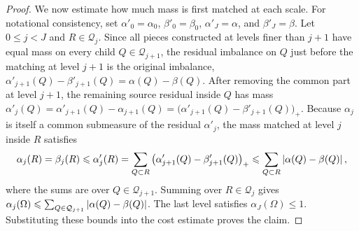 \begin{proof}
	We now estimate how much mass is first matched at each scale. For notational consistency, set \(\alpha'_0=\alpha_0\), \(\beta'_0=\beta_0\), \(\alpha'_J=\alpha\), and \(\beta'_J=\beta\). Let \(0\leq j<J\) and \(R\in\mathcal Q_j\). Since all pieces constructed at levels finer than \(j+1\) have equal mass on every child \(Q\in\mathcal Q_{j+1}\), the residual imbalance on \(Q\) just before the matching at level \(j+1\) is the original imbalance, \(\alpha'_{j+1}(Q)-\beta'_{j+1}(Q)=\alpha(Q)-\beta(Q)\).
	After removing the common part at level \(j+1\), the remaining source residual inside \(Q\) has mass
	$\alpha'_j(Q) = \alpha'_{j+1}(Q)-\alpha_{j+1}(Q) = \big(\alpha'_{j+1}(Q)-\beta'_{j+1}(Q)\big)_+$.
	Because \(\alpha_j\) is itself a common submeasure of the residual \(\alpha'_j\), the mass matched at level \(j\) inside \(R\) satisfies
	\[
		\alpha_j(R)=\beta_j(R)
		\leqslant \alpha'_j(R)
		=
		\sum_{Q\subset R}
		\big(\alpha'_{j+1}(Q)-\beta'_{j+1}(Q)\big)_+
		\leqslant
		\sum_{Q\subset R}
		\left\lvert\alpha(Q)-\beta(Q)\right\rvert,
	\]
	where the sums are over \(Q\in\mathcal Q_{j+1}\). Summing over \(R\in\mathcal Q_j\) gives
	$\alpha_j(\Omega) \leqslant \sum_{Q\in\mathcal Q_{j+1}}\left\lvert\alpha(Q)-\beta(Q)\right\rvert$.
	The last level satisfies \(\alpha_J(\Omega)\leq1\). Substituting these bounds into the cost estimate proves the claim.
\end{proof}

